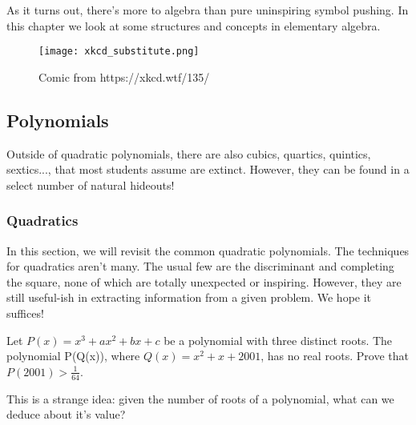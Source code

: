 \documentclass[../main.tex]{subfiles}
\begin{document}
As it turns out, there's more to algebra than pure uninspiring symbol pushing. In this chapter we look at some structures and concepts in elementary algebra.

\begin{figure}[H]
    \centering
    \texttt{[image: xkcd\_substitute.png]}
    \caption{Comic from https://xkcd.wtf/135/}
\end{figure}

\subsection{Polynomials}
Outside of quadratic polynomials, there are also cubics, quartics, quintics, sextics..., that most students assume are extinct. However, they can be found in a select number of natural hideouts!

\subsubsection{Quadratics}
In this section, we will revisit the common quadratic polynomials.
The techniques for quadratics aren't many. The usual few are the discriminant and completing the square, none of which are totally unexpected or inspiring. However, they are still useful-ish in extracting information from a given problem. We hope it suffices!
\begin{example}[2010-2011 Mandelbrot]
    Let $P(x)=x^3+ax^2+bx+c$ be a polynomial with three distinct roots. The polynomial P(Q(x)), where $Q(x)=x^2+x+2001$, has no real roots. Prove that $P(2001)>\frac{1}{64}$.
\end{example}
This is a strange idea: given the number of roots of a polynomial, what can we deduce about it's value?
\end{document}
